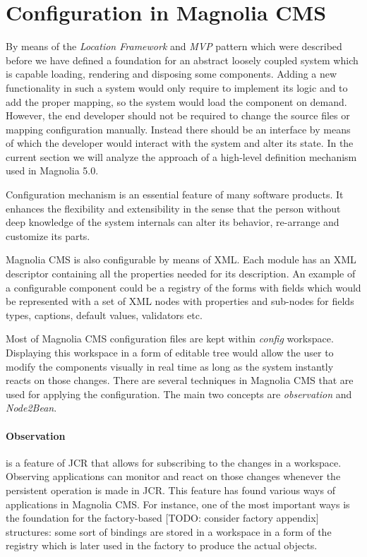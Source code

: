 \section{Configuration in Magnolia CMS}
By means of the \emph{Location Framework} and \emph{MVP} pattern which were
described before we have defined a foundation for an abstract loosely coupled
system which is capable loading, rendering and disposing some components.
Adding a new functionality in such a system would only require to
implement its logic and to add the proper mapping, so the system would load the
component on demand. However, the end developer should not be required to change
the source files or mapping configuration manually. Instead there should be an
interface by means of which the developer would interact with the system and
alter its state. In the current section we will analyze the approach of a
high-level definition mechanism used in Magnolia 5.0.

Configuration mechanism is an essential feature of many software products. It
enhances the flexibility and extensibility in the sense that the person without
deep knowledge of the system internals can alter its behavior, re-arrange and
customize its parts. 

Magnolia CMS is also configurable by means of XML. Each module has an XML
descriptor containing all the properties needed for its description. An example
of a configurable component could be a registry of the forms with fields which
would be represented with a set of XML nodes with properties and sub-nodes for
fields types, captions, default values, validators etc. 

Most of Magnolia CMS configuration files are kept within \emph{config}
workspace. Displaying this workspace in a form of editable tree would allow the
user to modify the components visually in real time as long as the system
instantly reacts on those changes.
There are several techniques in Magnolia CMS that are used for applying the
configuration. The main two concepts are \emph{observation} and \emph{Node2Bean}.

\paragraph{Observation} is a feature of JCR that allows for subscribing to the
changes in a workspace. Observing applications can monitor and react on those
changes whenever the persistent operation is made in JCR. This feature has found
various ways of applications in Magnolia CMS. For instance, one of the most
important ways is the foundation for the factory-based [TODO: consider factory
appendix] structures: some sort of bindings are stored in a workspace in a form
of the registry which is later used in the factory to produce the actual objects.

